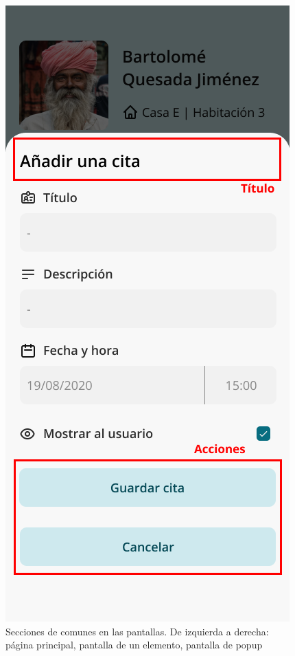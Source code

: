 \begin{figure}[h!]
    \endminipage\hfill
        \centering
        \includegraphics[width=\linewidth]{diseno/app/presentacion/secciones-popup.png}
    \endminipage
    \caption{ Secciones de comunes en las pantallas. De izquierda a derecha: página principal, pantalla de un elemento, pantalla de popup }
    \label{fig:secciones}
\end{figure}

